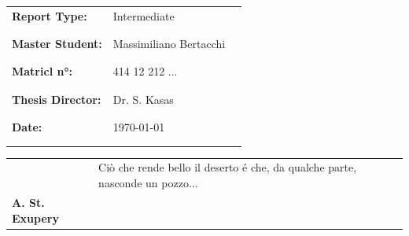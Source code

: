\documentclass[11pt, a4paper]{article}
\begin{document}
\thispagestyle{firstpage}
\vspace{4cm}
\begin{tabular}{m{6cm} m{5cm} m{3cm}}
                 \bfseries{Report Type:} & Intermediate & \\\\\\
                 \bfseries{Master Student:} & Massimiliano Bertacchi & \dotfill{} \\\\\\
                 \bfseries{Matricl n°:} & 414 12 212 ... & \dotfill{} \\\\\\
%
%
                 \bfseries{Thesis Director:} & Dr. S. Kasas & \dotfill{} \\\\\\
                 \bfseries{Date:} & \today & \\\\\\
               \end{tabular}%
\newpage
\pagestyle{fancy}
\fancyhead{} %
\setlength{\headheight}{24pt}
\setlength{\headheight}{74pt}
\begin{tabular}{m{8cm} m{5cm} m{4cm}}
		 \bfseries{} & Ciò che rende bello il deserto é che, da qualche parte, nasconde un pozzo... \\
         \bfseries{} A. St. Exupery
%
%
%
 \end{tabular}%
\fancyfoot{} %
\fancyfoot[RE,LO]{\thepage}

\newpage
\tableofcontents %

\newpage
\setcounter{page}{1}
\pagestyle{fancy}
\fancyhead{} %
\setlength{\headheight}{24pt}
\end{document}
